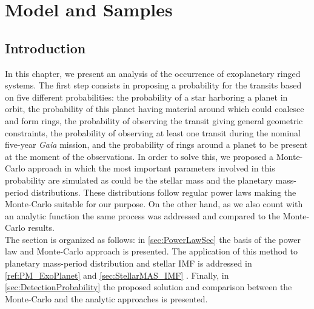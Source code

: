 \chapter{\textbf{Model and Samples}} \label{ch: Model}
\vspace{0.5cm} 

\section{Introduction}

In this chapter, we present an analysis of the occurrence of exoplanetary ringed systems. The first step consists in proposing a probability for the transits based on five different probabilities: the probability of a star harboring a planet in orbit, the probability of this planet having material around which could coalesce and form rings, the probability of observing the transit giving general geometric constraints, the probability of observing at least one transit during the nominal five-year \textit{Gaia} mission, and the probability of rings around a planet to be present at the moment of the observations. In order to solve this, we proposed a Monte-Carlo approach in which the most important parameters involved in this probability are simulated as could be the stellar mass and the planetary mass-period distributions. These distributions follow regular power laws making the Monte-Carlo suitable for our purpose. On the other hand, as we also count with an analytic function the same process was addressed and compared to the Monte-Carlo results.\\

The section is organized as follows: in \autoref{sec:PowerLawSec} the basis of the power law and Monte-Carlo approach is presented. The application of this method to planetary mass-period distribution and stellar IMF is addressed in \autoref{ref:PM_ExoPlanet} and \autoref{sec:StellarMAS_IMF} . Finally, in \autoref{sec:DetectionProbability} the proposed solution and comparison between the Monte-Carlo and the analytic approaches is presented. 


